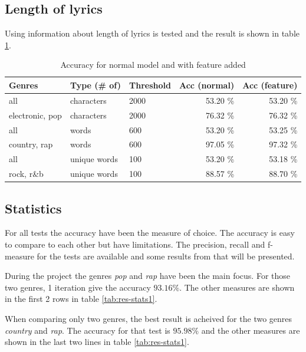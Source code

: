\documentclass[a4paper, 12pt]{article}
\begin{document}
\subsection{Length of lyrics}
Using information about length of lyrics is tested and the result is shown in table \ref{tab:res-lengths}.

\begin{table}[h]
\begin{center}
    \begin{tabular}{| l | l | l | r | r |}
        \hline
        Genres & Type (\# of)& Threshold & Acc (normal) & Acc (feature) \\
        \hline
        all             & characters    & 2000 & 53.20 \% & 53.20 \% \\ \hline
        electronic, pop & characters    & 2000 & 76.32 \% & 76.32 \% \\ \hline
        all             & words         & 600  & 53.20 \% & 53.25 \% \\ \hline
        country, rap    & words         & 600  & 97.05 \% & 97.32 \% \\ \hline
        all             & unique words  & 100  & 53.20 \% & 53.18 \% \\ \hline
        rock, r\&b      & unique words  & 100  & 88.57 \% & 88.70 \% \\ \hline
    \end{tabular}
    \caption{Accuracy for normal model and with feature added}
    \label{tab:res-lengths}
\end{center}
\end{table}

\subsection{Statistics}
For all tests the accuracy have been the measure of choice.
The accuracy is easy to compare to each other but have limitations.
The precision, recall and f-measure for the tests are available and some results from that will be presented.

During the project the genres \textit{pop} and \textit{rap} have been the main focus.
For those two genres, 1 iteration give the accuracy $93.16\%$.
The other measures are shown in the first 2 rows in table \ref{tab:res-stats1}.

When comparing only two genres, the best result is acheived for the two genres \textit{country} and \textit{rap}. The accuracy for that test is $95.98\%$ and the other measures are shown in the last two lines in table \ref{tab:res-stats1}.
\end{document}
